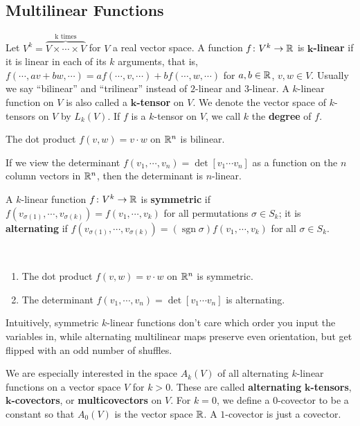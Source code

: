 \subsection{Multilinear Functions}
Let $V^k=\overset{\text{k times}  }{\overbrace{V\times \cdots \times V}} $ for $V$ a real vector space. A function $f \colon V^k \to \mathbb{R}$ is $\mathbf k$\textbf{-linear} if it is linear in each of its $k$ arguments, that is, $f(\cdots ,av+bw,\cdots )=af(\cdots ,v,\cdots )+b f(\cdots ,w,\cdots )$ for $a,b\in \mathbb{R}$, $v,w\in V$. Usually we say ``bilinear'' and ``trilinear'' instead of $2$-linear and $3$-linear. A $k$-linear function on $V$ is also called a $\mathbf k$\textbf{-tensor} on $V$. We denote the vector space of $k$-tensors on $V$ by $L_k(V)$. If $f$ is a $k$-tensor on $V$, we call $k$ the \textbf{degree} of $f$.
\begin{example}
    The dot product $f(v,w)=v\cdot w$ on $\mathbb{R}^n $ is bilinear. 
\end{example}
\begin{example}
    If we view the determinant $f(v_1,\cdots ,v_n )=\det[v_1\cdots v_n ]$ as a function on the $n$ column vectors in $\mathbb{R}^n $, then the determinant is $n$-linear.
\end{example}
\begin{definition}[]
    A $k$-linear function $f \colon V^k \to \mathbb{R}$ is \textbf{symmetric} if $f(v_{\sigma(1)},\cdots ,v_{\sigma(k)})=f(v_1,\cdots ,v_k)$ for all permutations $\sigma \in S_k$; it is \textbf{alternating} if $f(v_{\sigma(1)},\cdots ,v_{\sigma(k)})=(\operatorname{sgn}\sigma)f(v_1,\cdots ,v_k)$ for all $\sigma\in S_k$. 
\end{definition}
\begin{example}\,
    \begin{enumerate}[label=(\roman*)]
        \item The dot product $f(v,w)=v\cdot w$ on $\mathbb{R}^n $ is symmetric.
        \item The determinant $f(v_1,\cdots ,v_n )=\det[v_1\cdots v_n ]$ is alternating.
    \end{enumerate}
    Intuitively, symmetric $k$-linear functions don't care which order you input the variables in, while alternating multilinear maps preserve even orientation, but get flipped with an odd number of shuffles.
\end{example}
We are especially interested in the space $A_k(V)$ of all alternating $k$-linear functions on a vector space $V$ for $k>0$. These are called \textbf{alternating} $\mathbf k$\textbf{-tensors}, $\mathbf k$\textbf{-covectors}, or \textbf{multicovectors} on $V$. For $k=0$, we define a $0$-covector to be a constant so that $A_0(V)$ is the vector space $\mathbb{R}$. A $1$-covector is just a covector.
